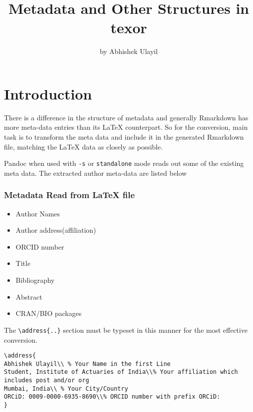 \title{Metadata and Other Structures in texor}
\author{by Abhishek Ulayil}

\maketitle


\section{Introduction}
There is a difference in the structure of metadata and generally Rmarkdown has more
meta-data entries than its LaTeX counterpart. So for the conversion, main task is to 
transform the meta data and include it in the generated Rmarkdown file, matching the
LaTeX data as closely as possible.

Pandoc when used with \verb|-s| or \verb|standalone| mode reads out some of the existing
meta data. The extracted author meta-data are listed below


\subsubsection{Metadata Read from LaTeX file}

\begin{itemize}
  \item Author Names 
  \item Author address(affiliation)
  \item ORCID number
  \item Title
  \item Bibliography
  \item Abstract
  \item CRAN/BIO packages
\end{itemize}

The \verb|\address{..}| section must be typeset in this manner for the most 
effective conversion.
\begin{verbatim}
\address{
Abhishek Ulayil\\ % Your Name in the first Line
Student, Institute of Actuaries of India\\% Your affiliation which includes post and/or org
Mumbai, India\\ % Your City/Country
ORCiD: 0009-0000-6935-8690\\% ORCID number with prefix ORCiD: 
}
\end{verbatim}

